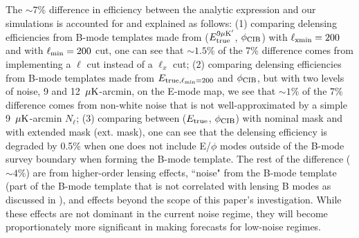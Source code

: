 The $\sim 7\%$ difference in efficiency between the analytic expression and our simulations is accounted for and explained as follows:
(1)
comparing delensing efficiencies from B-mode templates made from ($E^{9\mu {\rm K}^{\prime}}_{\rm true}$, $\phi_{\rm CIB}$)
with $\ell_{\rm x min} = 200$ and with $\ell_{\rm min} = 200$ cut, one can see that $\sim1.5\%$
of the 7\% difference comes from
implementing a $\ell$ cut instead of a $\ell_x$ cut;
(2) comparing delensing efficiencies from B-mode templates made from $E_{\rm true, \ell_{min} = 200}$ and $\phi_{\rm CIB}$,
but with two levels of noise, 9 and 12~$\mu {\rm K}$-arcmin, on the E-mode map, we see that $\sim1\%$ of the  7\% difference comes from
non-white noise that is not well-approximated by a simple 9~$\mu {\rm K}$-arcmin $N_{\ell}$;
(3) comparing between ($E_{\rm true}$, $\phi_{\rm CIB}$) with nominal mask and with extended mask (ext. mask),
one can see that the delensing efficiency is degraded by 0.5\% when one does not include E/$\phi$ modes outside of the B-mode survey boundary when forming the B-mode template.
The rest of the difference ($\sim4\%$) are from higher-order lensing effects, ``noise" from the B-mode template
(part of the B-mode template that is not correlated with lensing B modes as discussed in ), and effects beyond the scope of this paper's investigation.
While these effects are not dominant in the current noise regime, they will become proportionately more significant in making forecasts for low-noise regimes.

